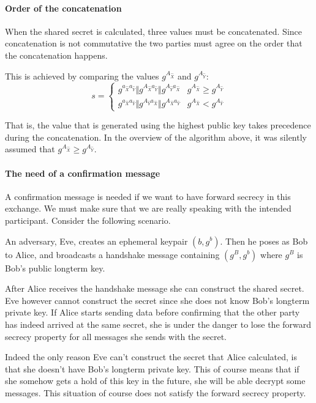 \paragraph{Order of the concatenation}
When the shared secret is calculated, three values must be concatenated. Since
concatenation is not commutative the two parties must agree on the order that the
concatenation happens.

This is achieved by comparing the values $g^{A_{\hat{X}}}$ and $g^{A_{\hat{Y}}}$:
\begin{equation*}
  s =
  \begin{cases}
    g^{a_{\hat{X}}a_{\hat{Y}}} \Vert g^{A_{\hat{X}}a_{\hat{Y}}} \Vert g^{A_{\hat{Y}}a_{\hat{X}}} & \text{$g^{A_{\hat{X}}} \geq g^{A_{\hat{Y}}}$}\\

    g^{a_{\hat{X}}a_{\hat{Y}}} \Vert g^{A_{\hat{Y}}a_{\hat{X}}} \Vert g^{A_{\hat{X}}a_{\hat{Y}}} &\text{$g^{A_{\hat{X}}} < g^{A_{\hat{Y}}}$}

  \end{cases}
\end{equation*}

That is, the value that is generated using the highest public key takes precedence during the
concatenation. In the overview of the algorithm above, it was silently assumed that $g^{A_{\hat{X}}} \geq g^{A_{\hat{Y}}}$.

\paragraph{The need of a confirmation message}
\label{confirm_message_explain}
A confirmation message is needed if we want to have forward secrecy in this exchange.
We must make sure that we are really speaking with the intended participant. Consider
the following scenario.

An adversary, Eve, creates an ephemeral keypair $(b, g^b)$. Then he poses as Bob to Alice,
and broadcasts a handshake message containing $(g^B,g^b)$ where $g^B$ is Bob's
public longterm key.

After Alice receives the handshake message she can construct the shared secret. Eve
however cannot construct the secret since she does not know Bob's longterm
private key. If Alice starts sending data before confirming that the other party
has indeed arrived at the same secret, she is under the danger to lose the forward
secrecy property for all messages she sends with the secret.

Indeed the only reason Eve can't construct the secret that Alice calculated, is
that she doesn't have Bob's longterm private key. This of course means that if
she somehow gets a hold of this key in the future, she will be able decrypt some messages. This situation of course does not satisfy the forward secrecy property.


